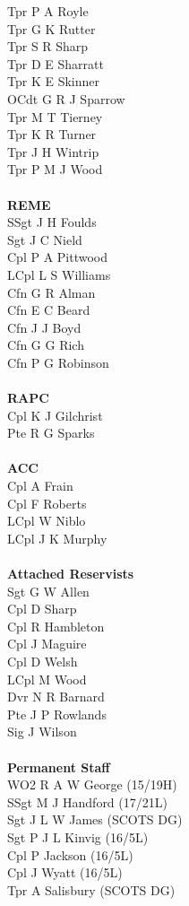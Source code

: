 \begin{multicols}{2}
  Tpr P A Royle \\
  Tpr G K Rutter \\
  Tpr S R Sharp \\
  Tpr D E Sharratt \\
  Tpr K E Skinner \\
  OCdt G R J Sparrow \\
  Tpr M T Tierney \\
  Tpr K R Turner \\
  Tpr J H Wintrip \\
  Tpr P M J Wood \\
  \\
  \textbf{REME} \\
  SSgt J H Foulds \\
  Sgt J C Nield \\
  Cpl P A Pittwood \\
  LCpl L S Williams \\
  Cfn G R Alman \\
  Cfn E C Beard \\
  Cfn J J Boyd \\
  Cfn G G Rich \\
  Cfn P G Robinson \\
  \\
  \textbf{RAPC} \\
  Cpl K J Gilchrist \\
  Pte R G Sparks \\
  \\
  \textbf{ACC} \\
  Cpl A Frain \\
  Cpl F Roberts \\
  LCpl W Niblo \\
  LCpl J K Murphy \\
  \\
  \textbf{Attached Reservists} \\
  Sgt G W Allen \\
  Cpl D Sharp \\
  Cpl R Hambleton \\
  Cpl J Maguire \\
  Cpl D Welsh \\
  LCpl M Wood \\
  Dvr N R Barnard \\
  Pte J P Rowlands \\
  Sig J Wilson \\
  \\
  \textbf{Permanent Staff} \\
  WO2 R A W George (15/19H) \\
  SSgt M J Handford (17/21L) \\
  Sgt J L W James (SCOTS DG) \\
  Sgt P J L Kinvig (16/5L) \\
  Cpl P Jackson (16/5L) \\
  Cpl J Wyatt (16/5L) \\
  Tpr A Salisbury (SCOTS DG) \\
\end{multicols}
